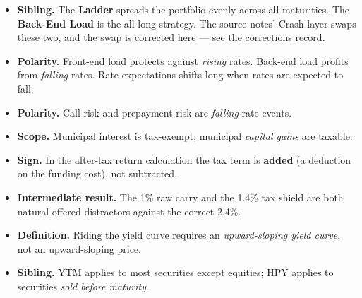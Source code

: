 \begin{lrtrapbox}
\begin{itemize}
\item \textbf{Sibling.} The \textbf{Ladder} spreads the portfolio evenly across all maturities. The \textbf{Back-End Load} is the all-long strategy. The source notes' Crash layer swaps these two, and the swap is corrected here — see the corrections record.
\item \textbf{Polarity.} Front-end load protects against \emph{rising} rates. Back-end load profits from \emph{falling} rates. Rate expectations shifts long when rates are expected to fall.
\item \textbf{Polarity.} Call risk and prepayment risk are \emph{falling}-rate events.
\item \textbf{Scope.} Municipal interest is tax-exempt; municipal \emph{capital gains} are taxable.
\item \textbf{Sign.} In the after-tax return calculation the tax term is \textbf{added} (a deduction on the funding cost), not subtracted.
\item \textbf{Intermediate result.} The 1\% raw carry and the 1.4\% tax shield are both natural offered distractors against the correct 2.4\%.
\item \textbf{Definition.} Riding the yield curve requires an \emph{upward-sloping yield curve}, not an upward-sloping price.
\item \textbf{Sibling.} YTM applies to most securities except equities; HPY applies to securities \emph{sold before maturity}.
\end{itemize}
\end{lrtrapbox}
